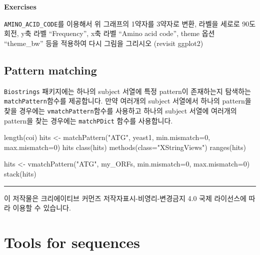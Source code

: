 \documentclass[
]{book}
\newenvironment{Shaded}{\begin{snugshade}}{\end{snugshade}}
\newcommand{\AttributeTok}[1]{\textcolor[rgb]{0.77,0.63,0.00}{#1}}
\newcommand{\DecValTok}[1]{\textcolor[rgb]{0.00,0.00,0.81}{#1}}
\newcommand{\FunctionTok}[1]{\textcolor[rgb]{0.00,0.00,0.00}{#1}}
\newcommand{\NormalTok}[1]{#1}
\newcommand{\OtherTok}[1]{\textcolor[rgb]{0.56,0.35,0.01}{#1}}
\newcommand{\StringTok}[1]{\textcolor[rgb]{0.31,0.60,0.02}{#1}}
\begin{document}
\textbf{Exercises }

\texttt{AMINO\_ACID\_CODE}를 이용해서 위 그래프의 1약자를 3약자로 변환, 라벨을 세로로 90도 회전, y축 라벨 ``Frequency'', x축 라벨 ``Amino acid code'', theme 옵션 ``theme\_bw'' 등을 적용하여 다시 그림을 그리시오 (revisit ggplot2)

\hypertarget{pattern-matching}{%
\section{Pattern matching}\label{pattern-matching}}

\texttt{Biostrings} 패키지에는 하나의 subject 서열에 특정 pattern이 존재하는지 탐색하는 \texttt{matchPattern}함수를 제공합니다. 만약 여러개의 subject 서열에서 하나의 pattern을 찾을 경우에는 \texttt{vmatchPattern}함수를 사용하고 하나의 subject 서열에 여러개의 pattern을 찾는 경우에는 \texttt{matchPDict} 함수를 사용합니다.

\begin{Shaded}
\begin{Highlighting}[]

\FunctionTok{length}\NormalTok{(coi)}
\NormalTok{hits }\OtherTok{\textless{}{-}} \FunctionTok{matchPattern}\NormalTok{(}\StringTok{"ATG"}\NormalTok{, yeast1, }\AttributeTok{min.mismatch=}\DecValTok{0}\NormalTok{, }\AttributeTok{max.mismatch=}\DecValTok{0}\NormalTok{)}
\NormalTok{hits}
\FunctionTok{class}\NormalTok{(hits)}
\FunctionTok{methods}\NormalTok{(}\AttributeTok{class=}\StringTok{"XStringViews"}\NormalTok{)}
\FunctionTok{ranges}\NormalTok{(hits)}

\NormalTok{hits }\OtherTok{\textless{}{-}} \FunctionTok{vmatchPattern}\NormalTok{(}\StringTok{"ATG"}\NormalTok{, my\_ORFs, }\AttributeTok{min.mismatch=}\DecValTok{0}\NormalTok{, }\AttributeTok{max.mismatch=}\DecValTok{0}\NormalTok{)}
\FunctionTok{stack}\NormalTok{(hits)}
\end{Highlighting}
\end{Shaded}

\begin{center}\rule{0.5\linewidth}{0.5pt}\end{center}

이 저작물은 크리에이티브 커먼즈 저작자표시-비영리-변경금지 4.0 국제 라이선스에 따라 이용할 수 있습니다.

\hypertarget{tools-for-sequences}{%
\chapter{Tools for sequences}\label{tools-for-sequences}}
\end{document}

